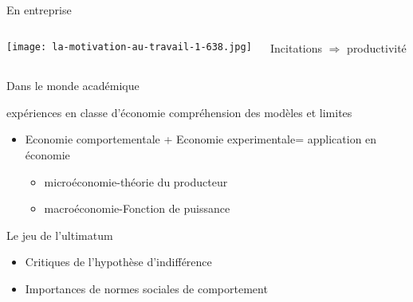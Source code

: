 \documentclass[serif]{beamer}
\begin{document}
\begin{frame}{En entreprise}
\begin{columns}
	\begin{column}{0.5\textwidth}
		\texttt{[image: la-motivation-au-travail-1-638.jpg]}
	\end{column}
	
	\begin{column}{0.5\textwidth}

	 \hspace*{0.5cm} 
	 \hspace*{0.5cm} Incitations $\Longrightarrow$ productivité

	\end{column}
		 
\end{columns}
\end{frame}
\begin{frame}{Dans le monde académique}
 \begin{block}{}
  expériences en classe d'économie     compréhension des modèles et limites
 \end{block}
 \begin{itemize}
 \item Economie comportementale + Economie experimentale= application en économie
 	\begin{itemize}
 		\item microéconomie-théorie du producteur
 		\item macroéconomie-Fonction de puissance
 	\end{itemize}
 \end{itemize}
 
\begin{exampleblock}{Le jeu de l'ultimatum}
\begin{itemize}
\item[\ding{164}] Critiques de l'hypothèse d'indifférence
\item[\ding{164}] Importances de normes sociales de comportement
\end{itemize}
\end{exampleblock}
\end{frame}
\end{document}
